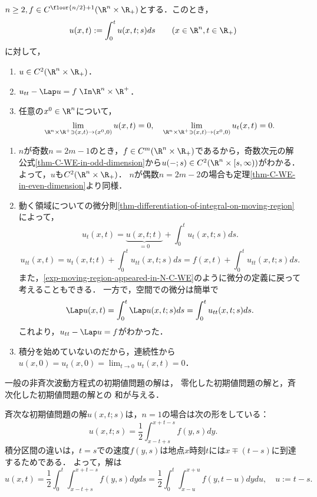 \documentclass[uplatex,dvipdfmx]{jsreport}
\begin{document}
\begin{theorem}[非斉次波動方程式の解]\label{thm-N-C-WE}
    $n\ge2,f\in C^{\floor{n/2}+1}(\R^n\times\R_+)$とする．このとき，
    \[u(x,t):=\int_0^tu(x,t;s)ds\qquad(x\in\R^n,t\in\R_+)\]
    に対して，
    \begin{enumerate}
        \item $u\in C^2(\R^n\times\R_+)$．
        \item $u_{tt}-\Lap u=f\;\In\R^n\times\R^+$．
        \item 任意の$x^0\in\R^n$について，
        \[\lim_{\R^n\times\R^+\ni(x,t)\to(x^0,0)}u(x,t)=0,\quad\lim_{\R^n\times\R^+\ni(x,t)\to(x^0,0)}u_t(x,t)=0.\]
    \end{enumerate}
\end{theorem}
\begin{Proof}\mbox{}
    \begin{enumerate}
        \item $n$が奇数$n=2m-1$のとき，$f\in C^m(\R^n\times\R_+)$であるから，奇数次元の解公式\ref{thm-C-WE-in-odd-dimension}から$u(-;s)\in C^2(\R^n\times[s,\infty))$がわかる．
        よって，$u$も$C^2(\R^n\times\R_+)$．
        $n$が偶数$n=2m-2$の場合も定理\ref{thm-C-WE-in-even-dimension}より同様．
        \item 動く領域についての微分則\ref{thm-differentiation-of-integral-on-moving-region}によって，
        \[u_t(x,t)=\underbrace{u(x,t;t)}_{=0}+\int^t_0u_t(x,t;s)ds.\]
        \[u_{tt}(x,t)=u_t(x,t;t)+\int^t_0u_{tt}(x,t;s)ds=f(x,t)+\int^t_0u_{tt}(x,t;s)ds.\]
        また，\ref{exp-moving-region-appeared-in-N-C-WE}のように微分の定義に戻って考えることもできる．
        一方で，空間での微分は簡単で
        \[\Lap u(x,t)=\int_0^t\Lap u(x,t;s)ds=\int_0^t u_{tt}(x,t;s)ds.\]
        これより，$u_{tt}-\Lap u=f$がわかった．
        \item 積分を始めていないのだから，連続性から$u(x,0)=u_t(x,0)=\lim_{t\to0}u_t(x,t)=0$．
    \end{enumerate}
\end{Proof}

\begin{corollary}
    一般の非斉次波動方程式の初期値問題の解は，
    零化した初期値問題の解と，斉次化した初期値問題の解との
    和が与える．
\end{corollary}


\begin{example}[$n=1$の場合の解]
    斉次な初期値問題の解$u(x,t;s)$は，$n=1$の場合は次の形をしている：
    \[u(x,t;s)=\frac{1}{2}\int^{x+t-s}_{x-t+s}f(y,s)dy.\]
    積分区間の違いは，$t=s$での速度$f(y,s)$は地点$x$時刻$t$には$x\mp(t-s)$に到達するためである．
    よって，解は
    \[u(x,t)=\frac{1}{2}\int^t_0\int^{x+t-s}_{x-t+s}f(y,s)dyds=\frac{1}{2}\int^t_0\int^{x+u}_{x-u}f(y,t-u)dydu,\quad u:=t-s.\]
\end{example}
\end{document}
